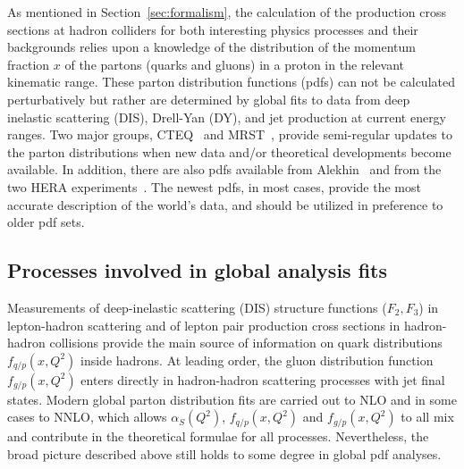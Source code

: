 \documentclass[12pt]{iopart}
\def\as{\alpha_S}
\begin{document}
As mentioned in Section~\ref{sec:formalism}, the calculation of the production cross sections at hadron colliders
for both interesting physics processes and their backgrounds relies upon a knowledge of the
distribution of the momentum fraction $x$ of the partons
(quarks and gluons) in a proton in the relevant  kinematic range. These parton
distribution functions (pdfs) can not be
calculated perturbatively but rather  are  determined by global fits to data from deep inelastic
scattering (DIS), Drell-Yan
(DY), and jet production at current energy ranges. Two major groups, CTEQ~\cite{Stump:2003yu}
and MRST~\cite{Martin:2004ir},
provide semi-regular updates to the parton distributions when new data and/or theoretical developments
become available. In
addition, there are also pdfs available from Alekhin~\cite{Alekhin:2005gq} and from the two HERA
experiments~\cite{Adloff:2000qk, Adloff:2003uh,Chekanov:2002pv, Chekanov:2005nn}.  The newest pdfs, in most cases, provide the
most accurate description of the world's data, and should be utilized in preference to older pdf sets. 

\subsection{Processes involved in global analysis fits}
\label{sec:global}

Measurements of deep-inelastic scattering (DIS) structure functions ($F_2,F_3$) in lepton-hadron scattering
and of lepton pair
production cross sections in hadron-hadron collisions provide the main source of information on quark distributions
$f_{q/p}(x,Q^2)$
inside hadrons. At leading order, the gluon distribution function 
$f_{g/p}(x,Q^2)$ enters directly
in hadron-hadron
scattering processes with jet final states.  Modern global parton distribution fits are carried out
to NLO and in some cases to NNLO, which allows $\as(Q^2)$, 
$f_{q/p}(x,Q^2)$
and 
$f_{g/p}(x,Q^2)$
to all mix and  contribute in the  theoretical formulae for all processes.
Nevertheless, the broad picture described above still holds to some degree in  global pdf  analyses.
\end{document}
